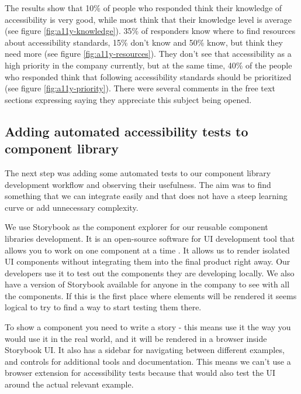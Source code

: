 \documentclass{master_thesis}
\begin{document}
The results show that 10\% of people who responded think their knowledge of accessibility is very good, while most think that their knowledge level is average (see figure \ref{fig:a11y-knowledge}). 35\% of responders know where to find resources about accessibility standards, 15\% don't know and 50\% know, but think they need more (see figure \ref{fig:a11y-resources}). They don't see that accessibility as a high priority in the company currently, but at the same time, 40\% of the people who responded think that following accessibility standards should be prioritized (see figure \ref{fig:a11y-priority}). There were several comments in the free text sections expressing saying they appreciate this subject being opened.

\subsection{Adding automated accessibility tests to component library}
The next step was adding some automated tests to our component library development workflow and observing their usefulness. The aim was to find something that we can integrate easily and that does not have a steep learning curve or add unnecessary complexity.

We use Storybook as the component explorer for our reusable component libraries development. It is an open-source software for UI development tool that allows you to work on one component at a time \citep{storybook}. It allows us to render isolated UI components without integrating them into the final product right away. Our developers use it to test out the components they are developing locally. We also have a version of Storybook available for anyone in the company to see with all the components. If this is the first place where elements will be rendered it seems logical to try to find a way to start testing them there.

To show a component you need to write a story - this means use it the way you would use it in the real world, and it will be rendered in a browser inside Storybook UI. It also has a sidebar for navigating between different examples, and controls for additional tools and documentation. This means we can't use a browser extension for accessibility tests because that would also test the UI around the actual relevant example.
\end{document}
